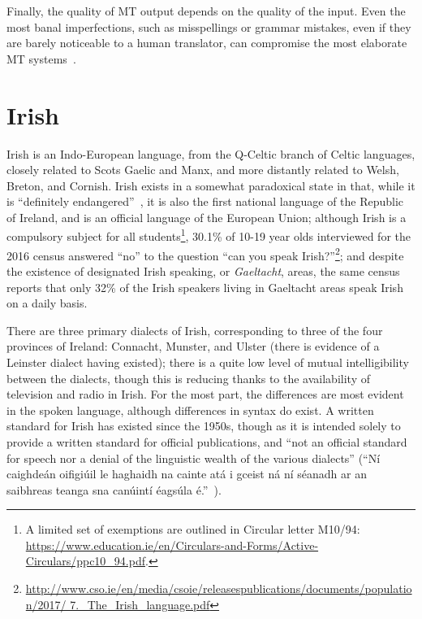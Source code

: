 Finally, the quality of MT output depends on the quality of the input. Even the most banal imperfections, 
such as misspellings or grammar mistakes, even if they are barely noticeable to a human translator, can 
compromise the most elaborate MT systems~\citep{porsiel12sec}.

\section{Irish}
\label{sect:introirish}

Irish is an Indo-European language, from the Q-Celtic branch of Celtic languages, closely related to 
Scots Gaelic and Manx, and more distantly related to Welsh, Breton, and Cornish. Irish exists in a 
somewhat paradoxical state in that, while it is ``definitely endangered''~\citep{moseley2010atlas}, it
is also the first national language of the Republic of Ireland, and is an official language of the
European Union; although Irish is a compulsory subject for all students\footnote{A limited set of
exemptions are outlined in Circular letter M10/94: 
\href{https://www.education.ie/en/Circulars-and-Forms/Active-Circulars/ppc10_94.pdf}{https://www.education.ie/en/Circulars-and-Forms/Active-Circulars/ppc10\_94.pdf}.},
30.1\% of 10-19 year olds interviewed for the 2016 census answered ``no'' to the question ``can you
speak Irish?''\footnote{\href{http://www.cso.ie/en/media/csoie/releasespublications/documents/population/2017/7._The_Irish_language.pdf}{http://www.cso.ie/en/media/csoie/releasespublications/documents/population/2017/ 7.\_The\_Irish\_language.pdf}};
and despite the existence of designated Irish speaking, or \textit{Gaeltacht}, areas, the same census
reports that only 32\% of the Irish speakers living in Gaeltacht areas speak Irish on a daily basis.

There are three primary dialects of Irish, corresponding to three of the four provinces of Ireland:
Connacht, Munster, and Ulster (there is evidence of a Leinster dialect having existed); there is
a quite low level of mutual intelligibility between the dialects, though this is reducing thanks
to the availability of television and radio in Irish. For the most part, the differences are most
evident in the spoken language, although differences in syntax do exist. A written standard for
Irish has existed since the 1950s, though as it is intended solely to provide a written standard
for official publications, and ``not an official standard for speech nor a denial of the linguistic wealth of the various dialects''
(``Ní caighdeán oifigiúil le haghaidh na cainte atá i gceist ná ní séanadh ar an saibhreas teanga sna canúintí éagsúla é.''~\citep[xviii]{caighdean2017}).

